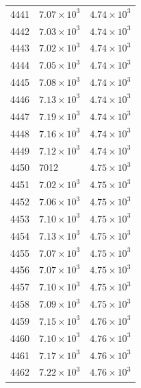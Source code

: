 \begin{table}[H]
\begin{tabular}{lll}
4441 & $\displaystyle 7.07 \times 10^{3}$ & $\displaystyle 4.74 \times 10^{3}$ \\
4442 & $\displaystyle 7.03 \times 10^{3}$ & $\displaystyle 4.74 \times 10^{3}$ \\
4443 & $\displaystyle 7.02 \times 10^{3}$ & $\displaystyle 4.74 \times 10^{3}$ \\
4444 & $\displaystyle 7.05 \times 10^{3}$ & $\displaystyle 4.74 \times 10^{3}$ \\
4445 & $\displaystyle 7.08 \times 10^{3}$ & $\displaystyle 4.74 \times 10^{3}$ \\
4446 & $\displaystyle 7.13 \times 10^{3}$ & $\displaystyle 4.74 \times 10^{3}$ \\
4447 & $\displaystyle 7.19 \times 10^{3}$ & $\displaystyle 4.74 \times 10^{3}$ \\
4448 & $\displaystyle 7.16 \times 10^{3}$ & $\displaystyle 4.74 \times 10^{3}$ \\
4449 & $\displaystyle 7.12 \times 10^{3}$ & $\displaystyle 4.74 \times 10^{3}$ \\
4450 & 7012 & $\displaystyle 4.75 \times 10^{3}$ \\
4451 & $\displaystyle 7.02 \times 10^{3}$ & $\displaystyle 4.75 \times 10^{3}$ \\
4452 & $\displaystyle 7.06 \times 10^{3}$ & $\displaystyle 4.75 \times 10^{3}$ \\
4453 & $\displaystyle 7.10 \times 10^{3}$ & $\displaystyle 4.75 \times 10^{3}$ \\
4454 & $\displaystyle 7.13 \times 10^{3}$ & $\displaystyle 4.75 \times 10^{3}$ \\
4455 & $\displaystyle 7.07 \times 10^{3}$ & $\displaystyle 4.75 \times 10^{3}$ \\
4456 & $\displaystyle 7.07 \times 10^{3}$ & $\displaystyle 4.75 \times 10^{3}$ \\
4457 & $\displaystyle 7.10 \times 10^{3}$ & $\displaystyle 4.75 \times 10^{3}$ \\
4458 & $\displaystyle 7.09 \times 10^{3}$ & $\displaystyle 4.75 \times 10^{3}$ \\
4459 & $\displaystyle 7.15 \times 10^{3}$ & $\displaystyle 4.76 \times 10^{3}$ \\
4460 & $\displaystyle 7.10 \times 10^{3}$ & $\displaystyle 4.76 \times 10^{3}$ \\
4461 & $\displaystyle 7.17 \times 10^{3}$ & $\displaystyle 4.76 \times 10^{3}$ \\
4462 & $\displaystyle 7.22 \times 10^{3}$ & $\displaystyle 4.76 \times 10^{3}$ \\

\end{tabular}
\end{table}
